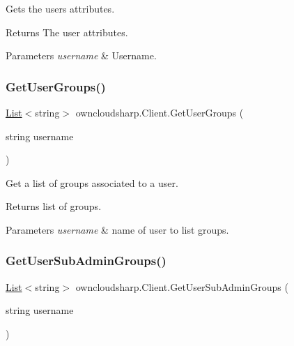 Gets the user\textquotesingle{}s attributes. 

\begin{DoxyReturn}{Returns}
The user attributes.
\end{DoxyReturn}

\begin{DoxyParams}{Parameters}
{\em username} & Username.\\
\hline
\end{DoxyParams}
\mbox{\label{classowncloudsharp_1_1_client_a18acf90fef2b57c03effffb6f052e873}} 
\subsubsection{\texorpdfstring{Get\+User\+Groups()}{GetUserGroups()}}
{\footnotesize\ttfamily \hyperlink{classowncloudsharp_1_1_client_a914c144ebbe207958829523f7eda3609}{List}$<$string$>$ owncloudsharp.\+Client.\+Get\+User\+Groups (\begin{DoxyParamCaption}\item[{string}]{username }\end{DoxyParamCaption})}



Get a list of groups associated to a user. 

\begin{DoxyReturn}{Returns}
list of groups.
\end{DoxyReturn}

\begin{DoxyParams}{Parameters}
{\em username} & name of user to list groups.\\
\hline
\end{DoxyParams}
\mbox{\label{classowncloudsharp_1_1_client_adc4b7d35c74b8ef9d32110c36bf57b37}} 
\subsubsection{\texorpdfstring{Get\+User\+Sub\+Admin\+Groups()}{GetUserSubAdminGroups()}}
{\footnotesize\ttfamily \hyperlink{classowncloudsharp_1_1_client_a914c144ebbe207958829523f7eda3609}{List}$<$string$>$ owncloudsharp.\+Client.\+Get\+User\+Sub\+Admin\+Groups (\begin{DoxyParamCaption}\item[{string}]{username }\end{DoxyParamCaption})}



